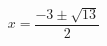 \documentclass[preview]{standalone}
\begin{document}
\begin{align*}
x =  \dfrac{-3 \pm \sqrt{13} }{2}
\end{align*}
\end{document}
